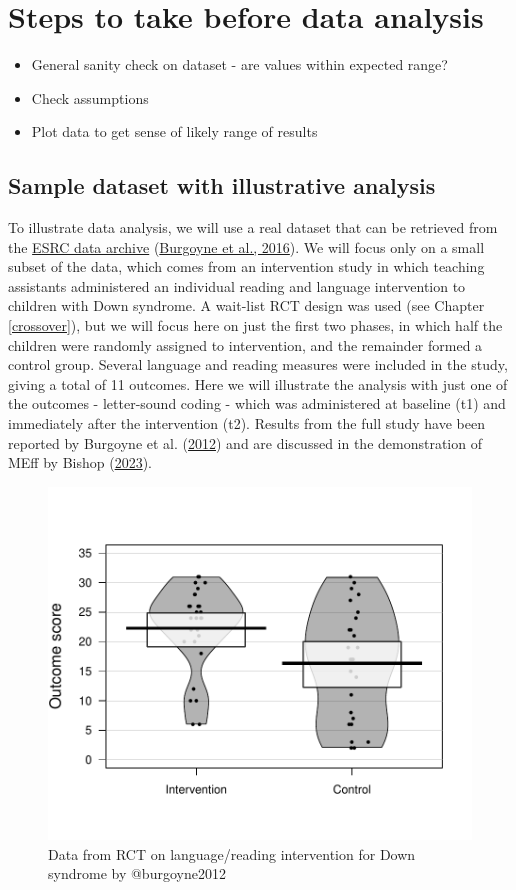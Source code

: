\documentclass{krantz}
\providecommand{\tightlist}{%
\setlength{\itemsep}{0pt}\setlength{\parskip}{0pt}}
\begin{document}
\hypertarget{steps-to-take-before-data-analysis}{%
\section{Steps to take before data analysis}\label{steps-to-take-before-data-analysis}}

\begin{itemize}
\tightlist
\item
  General sanity check on dataset - are values within expected range?
\item
  Check assumptions
\item
  Plot data to get sense of likely range of results
\end{itemize}

\hypertarget{sample-dataset-with-illustrative-analysis}{%
\subsection{Sample dataset with illustrative analysis}\label{sample-dataset-with-illustrative-analysis}}

To illustrate data analysis, we will use a real dataset that can be retrieved from the \href{https://reshare.ukdataservice.ac.uk/852291/}{ESRC data archive} (\protect\hyperlink{ref-burgoyne2016}{Burgoyne et al., 2016}). We will focus only on a small subset of the data, which comes from an intervention study in which teaching assistants administered an individual reading and language intervention to children with Down syndrome. A wait-list RCT design was used (see Chapter \ref{crossover}), but we will focus here on just the first two phases, in which half the children were randomly assigned to intervention, and the remainder formed a control group. Several language and reading measures were included in the study, giving a total of 11 outcomes. Here we will illustrate the analysis with just one of the outcomes - letter-sound coding - which was administered at baseline (t1) and immediately after the intervention (t2). Results from the full study have been reported by Burgoyne et al. (\protect\hyperlink{ref-burgoyne2012}{2012}) and are discussed in the demonstration of MEff by Bishop (\protect\hyperlink{ref-bishop2023b}{2023}).

\begin{center}
\begin{figure}
\includegraphics[width=0.5\linewidth]{images_bw/pirateRCT} \caption{Data from RCT on language/reading intervention for Down syndrome by @burgoyne2012}\label{fig:pirateRCT}
\end{figure}
\end{center}
\end{document}
